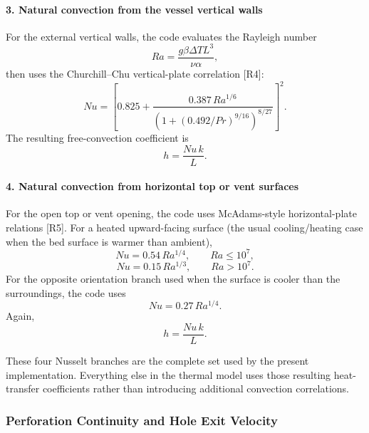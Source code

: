 \documentclass{article}
\begin{document}
\paragraph*{3. Natural convection from the vessel vertical walls}

For the external vertical walls, the code evaluates the Rayleigh number
\begin{equation}
Ra = \frac{g\beta \Delta T L^3}{\nu \alpha},
\end{equation}
then uses the Churchill--Chu vertical-plate correlation [R4]:
\begin{equation}
Nu
=
\left[
0.825+
\frac{0.387\,Ra^{1/6}}
{\left(1+(0.492/Pr)^{9/16}\right)^{8/27}}
\right]^2.
\end{equation}
The resulting free-convection coefficient is
\begin{equation}
h = \frac{Nu\,k}{L}.
\end{equation}

\paragraph*{4. Natural convection from horizontal top or vent surfaces}

For the open top or vent opening, the code uses McAdams-style horizontal-plate
relations [R5]. For a heated upward-facing surface (the usual cooling/heating
case when the bed surface is warmer than ambient),
\begin{equation}
Nu = 0.54\,Ra^{1/4},
\qquad Ra \le 10^7,
\end{equation}
\begin{equation}
Nu = 0.15\,Ra^{1/3},
\qquad Ra > 10^7.
\end{equation}
For the opposite orientation branch used when the surface is cooler than the
surroundings, the code uses
\begin{equation}
Nu = 0.27\,Ra^{1/4}.
\end{equation}
Again,
\begin{equation}
h = \frac{Nu\,k}{L}.
\end{equation}

These four Nusselt branches are the complete set used by the present
implementation. Everything else in the thermal model uses those resulting
heat-transfer coefficients rather than introducing additional convection
correlations.

\subsubsection{Perforation Continuity and Hole Exit Velocity}
\end{document}
